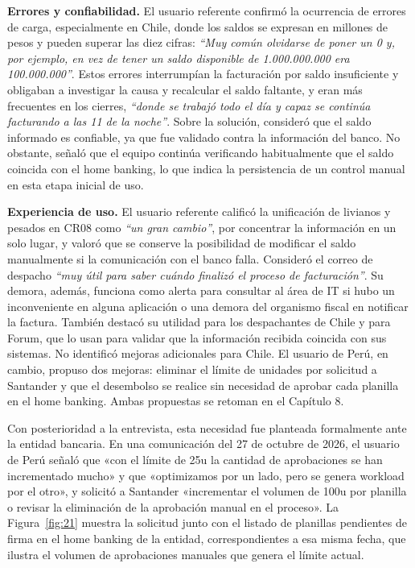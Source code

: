 \textbf{Errores y confiabilidad.} El usuario referente confirmó la ocurrencia de errores de carga, especialmente en Chile, donde los saldos se expresan en millones de pesos y pueden superar las diez cifras: \emph{``Muy común olvidarse de poner un 0 y, por ejemplo, en vez de tener un saldo disponible de 1.000.000.000 era 100.000.000''}. Estos errores interrumpían la facturación por saldo insuficiente y obligaban a investigar la causa y recalcular el saldo faltante, y eran más frecuentes en los cierres, \emph{``donde se trabajó todo el día y capaz se continúa facturando a las 11 de la noche''}. Sobre la solución, consideró que el saldo informado es confiable, ya que fue validado contra la información del banco. No obstante, señaló que el equipo continúa verificando habitualmente que el saldo coincida con el home banking, lo que indica la persistencia de un control manual en esta etapa inicial de uso.

\textbf{Experiencia de uso.} El usuario referente calificó la unificación de livianos y pesados en CR08 como \emph{``un gran cambio''}, por concentrar la información en un solo lugar, y valoró que se conserve la posibilidad de modificar el saldo manualmente si la comunicación con el banco falla. Consideró el correo de despacho \emph{``muy útil para saber cuándo finalizó el proceso de facturación''}. Su demora, además, funciona como alerta para consultar al área de IT si hubo un inconveniente en alguna aplicación o una demora del organismo fiscal en notificar la factura. También destacó su utilidad para los despachantes de Chile y para Forum, que lo usan para validar que la información recibida coincida con sus sistemas. No identificó mejoras adicionales para Chile. El usuario de Perú, en cambio, propuso dos mejoras: eliminar el límite de unidades por solicitud a Santander y que el desembolso se realice sin necesidad de aprobar cada planilla en el home banking. Ambas propuestas se retoman en el Capítulo 8.

Con posterioridad a la entrevista, esta necesidad fue planteada formalmente ante la entidad bancaria. En una comunicación del 27 de octubre de 2026, el usuario de Perú señaló que «con el límite de 25u la cantidad de aprobaciones se han incrementado mucho» y que «optimizamos por un lado, pero se genera workload por el otro», y solicitó a Santander «incrementar el volumen de 100u por planilla o revisar la eliminación de la aprobación manual en el proceso». La Figura~\ref{fig:21} muestra la solicitud junto con el listado de planillas pendientes de firma en el home banking de la entidad, correspondientes a esa misma fecha, que ilustra el volumen de aprobaciones manuales que genera el límite actual.

